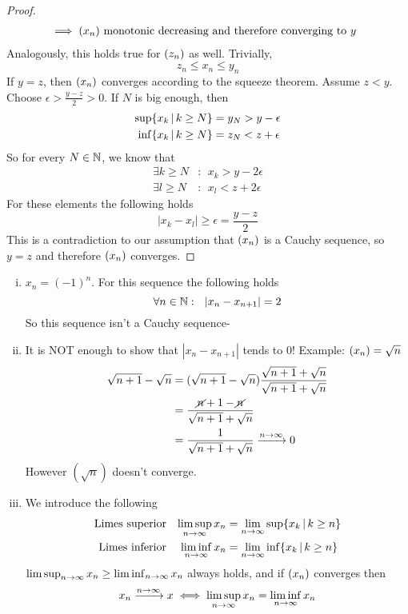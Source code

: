 \documentclass[../../script.tex]{subfiles}
\begin{document}
\begin{proof}
\begin{align}
	&\implies (x_n) \text{ monotonic decreasing and therefore converging to } y
\end{align}
Analogously, this holds true for $(z_n)$ as well. Trivially,
\begin{equation}
	z_n \le x_n \le y_n
\end{equation}
If $y = z$, then $(x_n)$ converges according to the squeeze theorem. Assume $z < y$. Choose $\epsilon > \frac{y - z}{2} > 0$. If $N$ is big enough, then
\begin{align}
	\sup \{ x_k \,\vert\, k \ge N \} &= y_N > y - \epsilon \\
	\inf \{ x_k \,\vert\, k \ge N \} &= z_N < z + \epsilon
\end{align}
So for every $N \in \mathbb{N}$, we know that
\begin{align}
	\exists k \ge N&: ~~x_k > y - 2\epsilon \\
	\exists l \ge N&: ~~x_l < z  + 2\epsilon
\end{align}
For these elements the following holds
\begin{equation}
	|x_k - x_l| \ge \epsilon = \frac{y - z}{2}
\end{equation}
This is a contradiction to our assumption that $(x_n)$ is a Cauchy sequence, so $y = z$ and therefore $(x_n)$ converges.
\end{proof}

\begin{rem}\leavevmode
\begin{enumerate}[(i)]
	\item $x_n = (-1)^n$. For this sequence the following holds
	\[
		\forall n \in \mathbb{N}: ~~|x_n - x_{n+1}| = 2 
	\]
	So this sequence isn't a Cauchy sequence-
	
	\item It is NOT enough to show that $|x_n - x_{n+1}|$ tends to $0$! Example: $(x_n) = \sqrt{n}$
	\[
	\begin{split}
	\sqrt{n+1} - \sqrt{n} &= (\sqrt{n+1} - \sqrt{n}) \frac{\sqrt{n+1} + \sqrt{n}}{\sqrt{n+1} + \sqrt{n}} \\
	&= \frac{\cancel{n} + 1 - \cancel{n}}{\sqrt{n+1} + \sqrt{n}} \\
	&= \frac{1}{\sqrt{n+1} + \sqrt{n}} \convinf 0
	\end{split}
	\]
	However $(\sqrt{n})$ doesn't converge.
	
	\item We introduce the following
	\begin{align*}
		\text{Limes superior}& & \limsup_{n \rightarrow \infty} x_n &= \lim_{n \rightarrow \infty} \sup \{ x_k \,\vert\, k \ge n \} \\
		\text{Limes inferior}& & \liminf_{n \rightarrow \infty} x_n &= \lim_{n \rightarrow \infty} \inf \{ x_k \,\vert\, k \ge n \}
	\end{align*}
	$\limsup_{n \rightarrow \infty} x_n \ge \liminf_{n \rightarrow \infty} x_n$ always holds, and if $(x_n)$ converges then
	\[
		x_n \convinf x \iff \limsupn x_n = \liminfn x_n	
	\]
\end{enumerate}
\end{rem}
\end{document}
